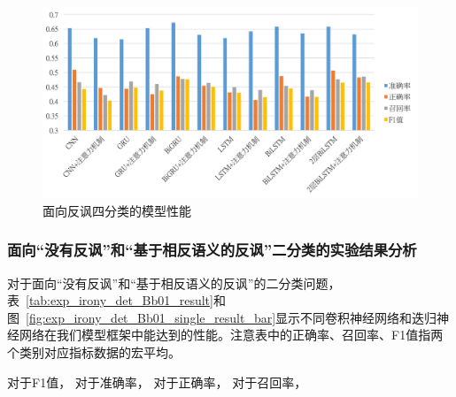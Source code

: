 \begin{figure}[H]
  \centering
  \includegraphics[width=\textwidth]{img/exp_irony_det_B_single_result_bar.png}
  \caption{面向反讽四分类的模型性能}
  \label{fig:exp_irony_det_B_single_result_bar}
\end{figure}

\subsubsection{面向“没有反讽”和“基于相反语义的反讽”二分类的实验结果分析}

对于面向“没有反讽”和“基于相反语义的反讽”的二分类问题，表~\ref{tab:exp_irony_det_Bb01_result}和图~\ref{fig:exp_irony_det_Bb01_single_result_bar}显示不同卷积神经网络和迭归神经网络在我们模型框架中能达到的性能。注意表中的正确率、召回率、F1值指两个类别对应指标数据的宏平均。

对于F1值，
对于准确率，
对于正确率，
对于召回率，


